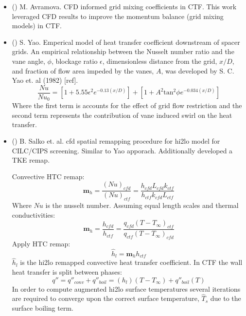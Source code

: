 \begin{itemize}
    \item (\checkmark) M. Avramova.  CFD informed grid mixing coefficients in CTF.  This work leveraged CFD results to improve the momentum balance (grid mixing models) in CTF. \cite{avramova2007}
    \item (\checkmark) S. Yao.  Emperical model of heat transfer coefficient downstream of spacer grids. \cite{yao82}
    An empirical relationship between the Nusselt number ratio and the vane angle, $\phi$, blockage ratio $\epsilon$, dimensionless distance from the grid, $x/D$, and fraction of flow area impeded by the vanes, $A$, was developed by S. C. Yao et. al (1982) [ref].
\begin{equation}
\frac{Nu}{Nu_0}  = \left[ 1 + 5.55 \epsilon^2 e^{-0.13(x/D)}\right] + \left[ 1 + A^2\mathrm{tan}^2\phi e^{-0.034(x/D)} \right]
\end{equation}
Where the first term is accounts for the effect of grid flow restriction and the second term represents the contribution of vane induced swirl on the heat transfer.
    
    \item (\checkmark) B. Salko et. al. cfd spatial remapping procedure for hi2lo model for CILC/CIPS screening. \cite{salko17}
    Similar to Yao apporach.  Additionally developed a TKE remap.
    
    Convective HTC remap:
    \begin{equation}
    	\mathbf m_h = \frac{(Nu)_{cfd}}{(Nu)_{ctf}} = \frac{h_{cfd} L_{cfd} k_{ctf} }{h_{ctf}k_{cfd} L_{ctf}} 
    \end{equation}
    Where $Nu$ is the nusselt number.  Assuming equal length scales and thermal conductivities:
    \begin{equation}
    	\mathbf m_h = \frac{h_{cfd}}{h_{ctf}} = \frac{q_{cfd}(T-T_\infty)_{ctf}}{q_{ctf}(T-T_\infty)_{cfd}}
    \end{equation}
    Apply HTC remap:
    \begin{equation}
    	\hat h_{l} = \mathbf m_h h_{ctf}
    \end{equation}
    $\hat h_l$ is the hi2lo remapped convective heat transfer coefficient.  In CTF the wall heat transfer is split between phases:
    \begin{equation}
    	q'' = q''_{conv} + q''_{boil} = (h_l)(T-T_{\infty}) + q''_{boil}(T)
    \end{equation}
    In order to compute augmented hi2lo surface temperatures
    several iterations are required to converge upon the correct surface temperature, $\hat T_s$ due to the surface boiling term.
    

\end{itemize}
